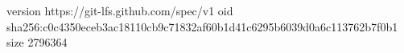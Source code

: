 version https://git-lfs.github.com/spec/v1
oid sha256:c0c4350eceb3ac18110cb9c71832af60b1d41c6295b6039d0a6c113762b7f0b1
size 2796364
